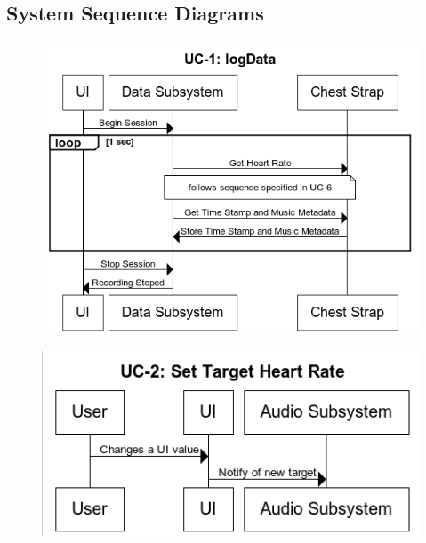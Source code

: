 \documentclass[letterpaper,english, 12pt]{scrreprt}
\begin{document}
\subsection{System Sequence Diagrams}
\begin{figure}[H]
        \centering
        \includegraphics[width=\textwidth]{img/ssd/ssd_uc1.png}\\
\end{figure}

\begin{figure}[H]
        \centering
        \includegraphics[width=\textwidth]{img/ssd/ssd_uc2.png}\\
\end{figure}
\end{document}
